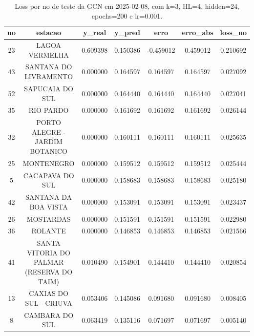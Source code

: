\begin{table}[h]
\centering
\caption{Loss por no de teste da GCN em 2025-02-08, com k=3, HL=4, hidden=24, epochs=200 e lr=0.001.}
\label{tab:gcn_loss_k3_hl4_h24_e200_d20250208}
\begin{tabular}{ccccccc}
\toprule
no & estacao & y\_real & y\_pred & erro & erro\_abs & loss\_no \\
\midrule
23 & LAGOA VERMELHA & 0.609398 & 0.150386 & -0.459012 & 0.459012 & 0.210692 \\
43 & SANTANA DO LIVRAMENTO & 0.000000 & 0.164597 & 0.164597 & 0.164597 & 0.027092 \\
52 & SAPUCAIA DO SUL & 0.000000 & 0.164440 & 0.164440 & 0.164440 & 0.027041 \\
35 & RIO PARDO & 0.000000 & 0.161692 & 0.161692 & 0.161692 & 0.026144 \\
32 & PORTO ALEGRE - JARDIM BOTANICO & 0.000000 & 0.160111 & 0.160111 & 0.160111 & 0.025635 \\
25 & MONTENEGRO & 0.000000 & 0.159512 & 0.159512 & 0.159512 & 0.025444 \\
5 & CACAPAVA DO SUL & 0.000000 & 0.158683 & 0.158683 & 0.158683 & 0.025180 \\
42 & SANTANA DA BOA VISTA & 0.000000 & 0.153091 & 0.153091 & 0.153091 & 0.023437 \\
26 & MOSTARDAS & 0.000000 & 0.151591 & 0.151591 & 0.151591 & 0.022980 \\
36 & ROLANTE & 0.000000 & 0.146853 & 0.146853 & 0.146853 & 0.021566 \\
41 & SANTA VITORIA DO PALMAR (RESERVA DO TAIM) & 0.010490 & 0.154901 & 0.144410 & 0.144410 & 0.020854 \\
13 & CAXIAS DO SUL - CRIUVA & 0.053406 & 0.145086 & 0.091680 & 0.091680 & 0.008405 \\
8 & CAMBARA DO SUL & 0.063419 & 0.135116 & 0.071697 & 0.071697 & 0.005140 \\
\bottomrule
\end{tabular}
\end{table}
